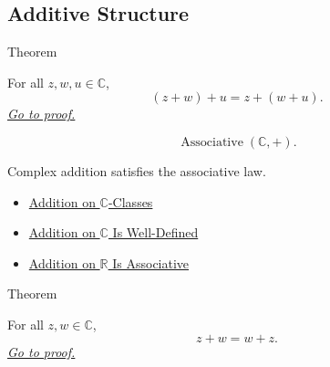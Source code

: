 \subsection*{Additive Structure}

\begin{theorembox}{Theorem}
\begin{theorem}
\label{thm:addition-on-c-associative}
For all \(z,w,u\in\mathbb{C}\),
\[
(z+w)+u=z+(w+u).
\]
\hyperref[prf:addition-on-c-associative]{\textit{Go to proof.}}
\end{theorem}
\end{theorembox}


\begin{remark*}
\[
\operatorname{Associative}(\mathbb{C},+).
\]
\end{remark*}

\begin{remark*}[Interpretation]
Complex addition satisfies the associative law.
\end{remark*}

\begin{dependencies}
\begin{itemize}
  \item \hyperref[def:addition-on-c-classes]{Addition on $\mathbb{C}$-Classes}
  \item \hyperref[thm:addition-on-c-well-defined]{Addition on $\mathbb{C}$ Is Well-Defined}
  \item \hyperref[thm:addition-on-r-associative]{Addition on $\mathbb{R}$ Is Associative}
\end{itemize}
\end{dependencies}

\begin{theorembox}{Theorem}
\begin{theorem}
\label{thm:addition-on-c-commutative}
For all \(z,w\in\mathbb{C}\),
\[
z+w=w+z.
\]
\hyperref[prf:addition-on-c-commutative]{\textit{Go to proof.}}
\end{theorem}
\end{theorembox}


